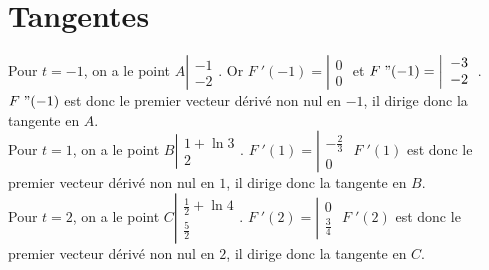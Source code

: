 \documentclass{article}
\begin{document}
\section{Tangentes}
Pour $t=-1$, on a le point $A\left|\begin{array}{c}-1\\-2\end{array}\right.$.
        Or $F\;'(-1) = \left|\begin{array}{c}0\\0\end{array}\right.$ et
                $F\;"(-1) = \left|\begin{array}{c}-3\\-2\end{array}\right.$.
                        $F\;"(-1)$ est donc le premier vecteur dérivé non nul en $-1$, il dirige
                        donc la tangente en $A$.\\
Pour $t=1$, on a le point $B\left|\begin{array}{c}1+\ln 3\\2\end{array}\right.$.
        $F\;'(1) = \left|\begin{array}{c}-\frac{2}{3}\\0\end{array}\right.$
                        $F\;'(1)$ est donc le premier vecteur dérivé non nul en $1$, il dirige
                        donc la tangente en $B$.\\
Pour $t=2$, on a le point $C\left|\begin{array}{c}\frac{1}{2}+\ln 4\\\frac{5}{2}\end{array}\right.$.
        $F\;'(2) = \left|\begin{array}{c}0\\\frac{3}{4}\end{array}\right.$
                $F\;'(2)$ est donc le premier vecteur dérivé non nul en $2$, il dirige
                        donc la tangente en $C$.\\
\end{document}
